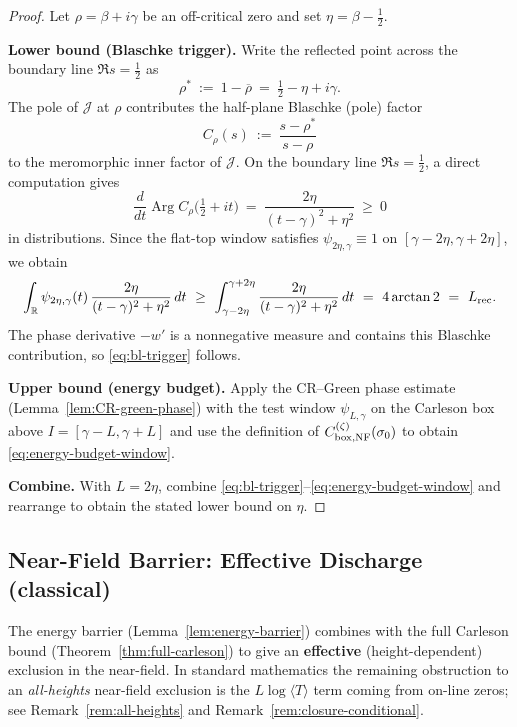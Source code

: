 \documentclass[11pt]{article}
\theoremstyle{definition}
\theoremstyle{remark}
\theoremstyle{definition}
\newcommand{\R}{\mathbb{R}}
\DeclareMathOperator{\Arg}{Arg}
\begin{document}
\begin{proof}
Let $\rho=\beta+i\gamma$ be an off-critical zero and set $\eta=\beta-\tfrac12$.
\smallskip

\noindent\textbf{Lower bound (Blaschke trigger).}
Write the reflected point across the boundary line $\Re s=\tfrac12$ as
\[
  \rho^\ast\ :=\ 1-\overline{\rho}\ =\ \tfrac12-\eta+i\gamma.
\]
The pole of $\mathcal J$ at $\rho$ contributes the half-plane Blaschke (pole) factor
\[
  C_\rho(s)\ :=\ \frac{s-\rho^\ast}{s-\rho}
\]
to the meromorphic inner factor of $\mathcal J$.
On the boundary line $\Re s=\tfrac12$, a direct computation gives
\[
  \frac{d}{dt}\Arg C_\rho\!\big(\tfrac12+it\big)\ =\ \frac{2\eta}{(t-\gamma)^2+\eta^2}\ \ge\ 0
\]
in distributions.
Since the flat-top window satisfies $\psi_{2\eta,\gamma}\equiv 1$ on $[\gamma-2\eta,\gamma+2\eta]$, we obtain
\[
  \int_{\R}\psi_{2\eta,\gamma}(t)\,\frac{2\eta}{(t-\gamma)^2+\eta^2}\,dt
  \ \ge\ \int_{\gamma-2\eta}^{\gamma+2\eta}\frac{2\eta}{(t-\gamma)^2+\eta^2}\,dt
  \ =\ 4\arctan 2\ =\ L_{\rm rec}.
\]
The phase derivative $-w'$ is a nonnegative measure and contains this Blaschke contribution, so \eqref{eq:bl-trigger} follows.

\smallskip
\noindent\textbf{Upper bound (energy budget).}
Apply the CR--Green phase estimate (Lemma~\ref{lem:CR-green-phase}) with the test window $\psi_{L,\gamma}$ on the Carleson box above $I=[\gamma-L,\gamma+L]$ and use the definition of $C_{{\rm box},{\rm NF}}^{(\zeta)}(\sigma_0)$ to obtain \eqref{eq:energy-budget-window}.

\smallskip
\noindent\textbf{Combine.}
With $L=2\eta$, combine \eqref{eq:bl-trigger}--\eqref{eq:energy-budget-window} and rearrange to obtain the stated lower bound on $\eta$.
\end{proof}

\subsection*{Near-Field Barrier: Effective Discharge (classical)}
\label{sec:near-field-status}

The energy barrier (Lemma~\ref{lem:energy-barrier}) combines with the full Carleson bound (Theorem~\ref{thm:full-carleson}) to give an \textbf{effective} (height-dependent) exclusion in the near-field. In standard mathematics the remaining obstruction to an \emph{all-heights} near-field exclusion is the $L\log\langle T\rangle$ term coming from on-line zeros; see Remark~\ref{rem:all-heights} and Remark~\ref{rem:closure-conditional}.
\end{document}
